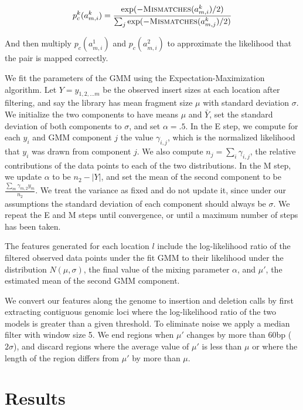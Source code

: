 \documentclass[11pt]{article}
\begin{document}
\begin{description}
\[ p^{k}_c(a^{k}_{m,i}) = \frac{\exp({-\textsc{Mismatches}(a^{k}_{m,i})/2)}}{\sum_j{\exp(-\textsc{Mismatches}(a^{k}_{m,j})/2)}} \]

And then multiply $p_c(a^{1}_{m,i})$ and $p_c(a^{2}_{m,i})$ to approximate the likelihood that the pair is mapped correctly.

We fit the parameters of the GMM using the Expectation-Maximization algorithm. Let $Y = y_{1,2, \ldots m}$ be the observed insert sizes at each location after filtering, and say the library has mean fragment size $\mu$ with standard deviation $\sigma$. We initialize the two components to have means $\mu$ and $\bar{Y}$, set the standard deviation of both components to $\sigma$, and set $\alpha = .5$. In the E step, we compute for each $y_i$ and GMM component $j$ the value $\gamma_{i,j}$, which is the normalized likelihood that $y_i$ was drawn from component $j$. We also compute $n_j = \sum_i{\gamma_{i,j}}$, the relative contributions of the data points to each of the two distributions. In the M step, we update $\alpha$ to be $n_2 - \left|Y\right|$, and set the mean of the second component to be $\frac{\sum_m{\gamma_{m,2}y_m}}{n_2}$. We treat the variance as fixed and do not update it, since under our assumptions the standard deviation of each component should always be $\sigma$. We repeat the E and M steps until convergence, or until a maximum number of steps has been taken.

The features generated for each location $l$ include the log-likelihood ratio of the filtered observed data points under the fit GMM to their likelihood under the distribution $N(\mu,\sigma)$, the final value of the mixing parameter $\alpha$, and $\mu'$, the estimated mean of the second GMM component.

\item[\sc{PostProcess}] We convert our features along the genome to insertion and deletion calls by first extracting contiguous genomic loci where the log-likelihood ratio of the two models is greater than a given threshold. To eliminate noise we apply a median filter with window size 5. We end regions when $\mu'$ changes by more than 60bp ($2\sigma$), and discard regions where the average value of $\mu'$ is less than $\mu$ or where the length of the region differs from $\mu'$ by more than $\mu$.
\end{description}


\section{Results}\label{results}
\end{document}
